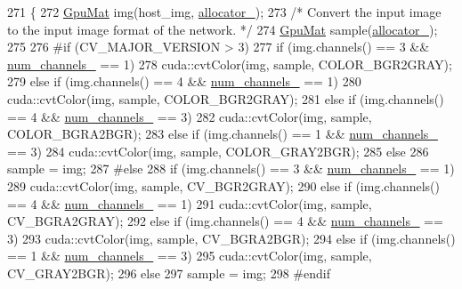 \begin{DoxyCode}
271 \{
272     \mbox{\hyperlink{gpu__allocator_8h_aa7700da124206551c0f9d273152f13fb}{GpuMat}} img(host\_img, \mbox{\hyperlink{class_s_s_d_af45a3ca33b8adcb4b2e23ebd23891947}{allocator\_}});
273     \textcolor{comment}{/* Convert the input image to the input image format of the network. */}
274     \mbox{\hyperlink{gpu__allocator_8h_aa7700da124206551c0f9d273152f13fb}{GpuMat}} sample(\mbox{\hyperlink{class_s_s_d_af45a3ca33b8adcb4b2e23ebd23891947}{allocator\_}});
275 
276 \textcolor{preprocessor}{#if (CV\_MAJOR\_VERSION > 3)}
277     \textcolor{keywordflow}{if} (img.channels() == 3 && \mbox{\hyperlink{class_s_s_d_affe6f7e948b0040bd958db34758d8ab1}{num\_channels\_}} == 1)
278         cuda::cvtColor(img, sample, COLOR\_BGR2GRAY);
279     \textcolor{keywordflow}{else} \textcolor{keywordflow}{if} (img.channels() == 4 && \mbox{\hyperlink{class_s_s_d_affe6f7e948b0040bd958db34758d8ab1}{num\_channels\_}} == 1)
280         cuda::cvtColor(img, sample, COLOR\_BGR2GRAY);
281     \textcolor{keywordflow}{else} \textcolor{keywordflow}{if} (img.channels() == 4 && \mbox{\hyperlink{class_s_s_d_affe6f7e948b0040bd958db34758d8ab1}{num\_channels\_}} == 3)
282         cuda::cvtColor(img, sample, COLOR\_BGRA2BGR);
283     \textcolor{keywordflow}{else} \textcolor{keywordflow}{if} (img.channels() == 1 && \mbox{\hyperlink{class_s_s_d_affe6f7e948b0040bd958db34758d8ab1}{num\_channels\_}} == 3)
284         cuda::cvtColor(img, sample, COLOR\_GRAY2BGR);
285     \textcolor{keywordflow}{else}
286         sample = img;
287 \textcolor{preprocessor}{#else}
288     \textcolor{keywordflow}{if} (img.channels() == 3 && \mbox{\hyperlink{class_s_s_d_affe6f7e948b0040bd958db34758d8ab1}{num\_channels\_}} == 1)
289         cuda::cvtColor(img, sample, CV\_BGR2GRAY);
290     \textcolor{keywordflow}{else} \textcolor{keywordflow}{if} (img.channels() == 4 && \mbox{\hyperlink{class_s_s_d_affe6f7e948b0040bd958db34758d8ab1}{num\_channels\_}} == 1)
291         cuda::cvtColor(img, sample, CV\_BGRA2GRAY);
292     \textcolor{keywordflow}{else} \textcolor{keywordflow}{if} (img.channels() == 4 && \mbox{\hyperlink{class_s_s_d_affe6f7e948b0040bd958db34758d8ab1}{num\_channels\_}} == 3)
293         cuda::cvtColor(img, sample, CV\_BGRA2BGR);
294     \textcolor{keywordflow}{else} \textcolor{keywordflow}{if} (img.channels() == 1 && \mbox{\hyperlink{class_s_s_d_affe6f7e948b0040bd958db34758d8ab1}{num\_channels\_}} == 3)
295         cuda::cvtColor(img, sample, CV\_GRAY2BGR);
296     \textcolor{keywordflow}{else}
297         sample = img;
298 \textcolor{preprocessor}{#endif}

\end{DoxyCode}
